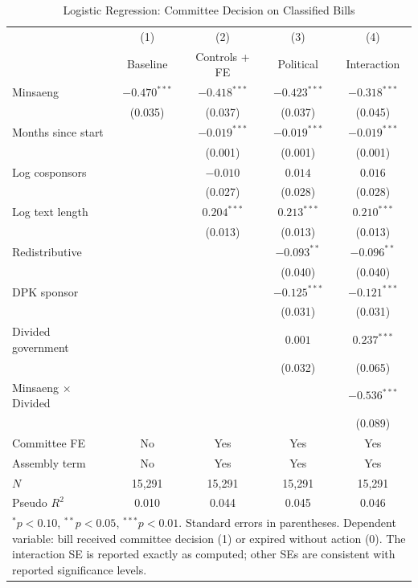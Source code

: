 \documentclass[11pt]{article}
\begin{document}
\begin{table}[H]
\centering
\caption{Logistic Regression: Committee Decision on Classified Bills}
\label{tab:main}
\begin{tabular}{lcccc}
\toprule
& (1) & (2) & (3) & (4) \\
& Baseline & Controls + FE & Political & Interaction \\
\midrule
Minsaeng & $-0.470^{***}$ & $-0.418^{***}$ & $-0.423^{***}$ & $-0.318^{***}$ \\
& (0.035) & (0.037) & (0.037) & (0.045) \\[3pt]
Months since start & & $-0.019^{***}$ & $-0.019^{***}$ & $-0.019^{***}$ \\
& & (0.001) & (0.001) & (0.001) \\[3pt]
Log cosponsors & & $-0.010$ & $0.014$ & $0.016$ \\
& & (0.027) & (0.028) & (0.028) \\[3pt]
Log text length & & $0.204^{***}$ & $0.213^{***}$ & $0.210^{***}$ \\
& & (0.013) & (0.013) & (0.013) \\[3pt]
Redistributive & & & $-0.093^{**}$ & $-0.096^{**}$ \\
& & & (0.040) & (0.040) \\[3pt]
DPK sponsor & & & $-0.125^{***}$ & $-0.121^{***}$ \\
& & & (0.031) & (0.031) \\[3pt]
Divided government & & & $0.001$ & $0.237^{***}$ \\
& & & (0.032) & (0.065) \\[3pt]
Minsaeng $\times$ Divided & & & & $-0.536^{***}$ \\
& & & & (0.089) \\
\midrule
Committee FE & No & Yes & Yes & Yes \\
Assembly term & No & Yes & Yes & Yes \\
$N$ & 15,291 & 15,291 & 15,291 & 15,291 \\
Pseudo $R^2$ & 0.010 & 0.044 & 0.045 & 0.046 \\
\bottomrule
\multicolumn{5}{p{0.90\textwidth}}{\footnotesize $^{*}p<0.10$, $^{**}p<0.05$, $^{***}p<0.01$. Standard errors in parentheses. Dependent variable: bill received committee decision (1) or expired without action (0). The interaction SE is reported exactly as computed; other SEs are consistent with reported significance levels.} \\
\end{tabular}
\end{table}
\end{document}
